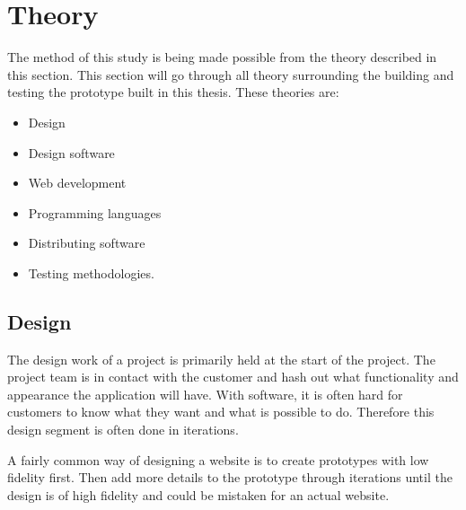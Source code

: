 \section{Theory}

The method of this study is being made possible from the theory described in this section. This section will go through all theory surrounding the building and testing the prototype built in this thesis. These theories are: 
\begin{itemize}
  \item Design
  \item Design software
  \item Web development
  \item Programming languages
  \item Distributing software
  \item Testing methodologies. 
\end{itemize}





\subsection{Design}%
\label{sub:Design}
The design work of a project is primarily held at the start of the project. The project team is in contact with the customer and hash out what functionality and appearance the application will have. With software, it is often hard for customers to know what they want and what is possible to do. Therefore this design segment is often done in iterations.

A fairly common way of designing a website is to create prototypes with low fidelity first. Then add more details to the prototype through iterations until the design is of high fidelity and could be mistaken for an actual website.

